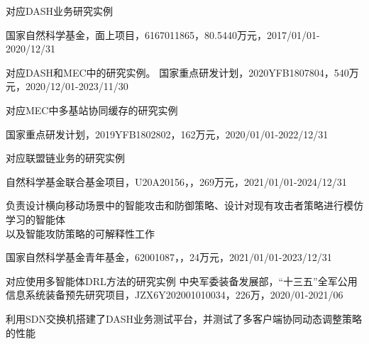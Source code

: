 \documentclass{resume}
\begin{document}
对应DASH业务研究实例

国家自然科学基金，面上项目，6167011865，80.5440万元，2017/01/01-2020/12/31

对应DASH和MEC中的研究实例。
国家重点研发计划，2020YFB1807804，540万元，2020/12/01-2023/11/30

对应MEC中多基站协同缓存的研究实例


国家重点研发计划，2019YFB1802802，162万元，2020/01/01-2022/12/31

对应联盟链业务的研究实例

自然科学基金联合基金项目，U20A20156，，269万元，2021/01/01-2024/12/31

负责设计横向移动场景中的智能攻击和防御策略、设计对现有攻击者策略进行模仿学习的智能体
\\以及智能攻防策略的可解释性工作

国家自然科学基金青年基金，62001087，，24万元，2021/01/01-2023/12/31

对应使用多智能体DRL方法的研究实例
中央军委装备发展部，“十三五”全军公用信息系统装备预先研究项目，JZX6Y202001010034，226万，2020/01-2021/06

利用SDN交换机搭建了DASH业务测试平台，并测试了多客户端协同动态调整策略的性能 


\end{document}
